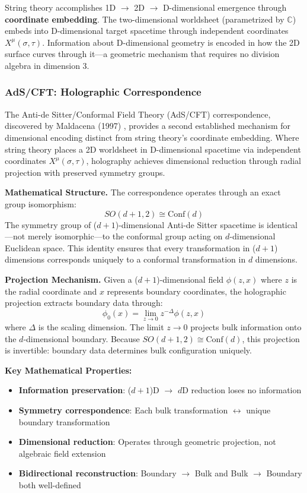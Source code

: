 String theory accomplishes 1D $\to$ 2D $\to$ D-dimensional emergence through \textbf{coordinate embedding}. The two-dimensional worldsheet (parametrized by $\mathbb{C}$) embeds into D-dimensional target spacetime through independent coordinates $X^\mu(\sigma,\tau)$. Information about D-dimensional geometry is encoded in how the 2D surface curves through it—a geometric mechanism that requires no division algebra in dimension 3.

\subsubsection{AdS/CFT: Holographic Correspondence}

The Anti-de Sitter/Conformal Field Theory (AdS/CFT) correspondence, discovered by Maldacena (1997) \cite{Maldacena1998}, provides a second established mechanism for dimensional encoding distinct from string theory's coordinate embedding. Where string theory places a 2D worldsheet in D-dimensional spacetime via independent coordinates $X^\mu(\sigma,\tau)$, holography achieves dimensional reduction through radial projection with preserved symmetry groups.

\textbf{Mathematical Structure.} The correspondence operates through an exact group isomorphism:
\[
    SO(d+1,2) \cong \text{Conf}(d)
\]
The symmetry group of ($d+1$)-dimensional Anti-de Sitter spacetime is identical—not merely isomorphic—to the conformal group acting on $d$-dimensional Euclidean space. This identity ensures that every transformation in ($d+1$) dimensions corresponds uniquely to a conformal transformation in $d$ dimensions.

\textbf{Projection Mechanism.} Given a ($d+1$)-dimensional field $\phi(z,x)$ where $z$ is the radial coordinate and $x$ represents boundary coordinates, the holographic projection extracts boundary data through:
\[
    \phi_0(x) = \lim_{z \to 0} z^{-\Delta} \phi(z,x)
\]
where $\Delta$ is the scaling dimension. The limit $z \to 0$ projects bulk information onto the $d$-dimensional boundary. Because $SO(d+1,2) \cong \text{Conf}(d)$, this projection is invertible: boundary data determines bulk configuration uniquely.

\textbf{Key Mathematical Properties:}
\begin{itemize}
    \item \textbf{Information preservation}: ($d+1$)D $\to$ $d$D reduction loses no information
    \item \textbf{Symmetry correspondence}: Each bulk transformation $\leftrightarrow$ unique boundary transformation
    \item \textbf{Dimensional reduction}: Operates through geometric projection, not algebraic field extension
    \item \textbf{Bidirectional reconstruction}: Boundary $\to$ Bulk and Bulk $\to$ Boundary both well-defined
\end{itemize}

